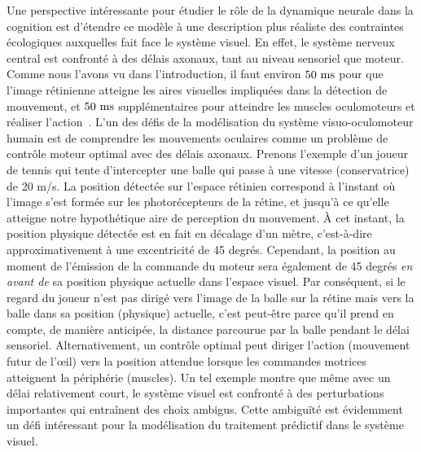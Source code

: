 Une perspective intéressante pour étudier le rôle de la dynamique
neurale dans la cognition est d'étendre ce modèle à une description plus
réaliste des contraintes écologiques auxquelles fait face le système
visuel. En effet, le système nerveux central est confronté à des délais
axonaux, tant au niveau sensoriel que moteur. Comme nous l'avons vu dans
l'introduction, il faut environ $50~\si{\milli\second}$ pour que l'image rétinienne
atteigne les aires visuelles impliquées dans la détection de mouvement,
et $50~\si{\milli\second}$ supplémentaires pour atteindre les muscles oculomoteurs et
réaliser l'action~\citep{Kirchner06}. L'un des défis de la
modélisation du système visuo-oculomoteur humain est de comprendre les
mouvements oculaires comme un problème de contrôle moteur optimal avec
des délais axonaux. Prenons l'exemple d'un joueur de tennis qui tente
d'intercepter une balle qui passe à une vitesse (conservatrice) de 20
m/s. La position détectée sur l'espace rétinien correspond à l'instant
où l'image s'est formée sur les photorécepteurs de la rétine, et jusqu'à
ce qu'elle atteigne notre hypothétique aire de perception du mouvement.
À cet instant, la position physique détectée est en fait en décalage d'un
mètre, c'est-à-dire approximativement à une excentricité de 45 degrés.
Cependant, la position au moment de l'émission de la commande du moteur
sera également de 45 degrés \emph{en avant de} sa position physique
actuelle dans l'espace visuel. Par conséquent, si le regard du joueur
n'est pas dirigé vers l'image de la balle sur la rétine mais vers la
balle dans sa position (physique) actuelle, c'est peut-être parce qu'il
prend en compte, de manière anticipée, la distance parcourue par la
balle pendant le délai sensoriel. Alternativement, un contrôle optimal
peut diriger l'action (mouvement futur de l'œil) vers la position
attendue lorsque les commandes motrices atteignent la périphérie
(muscles). Un tel exemple montre que même avec un délai relativement
court, le système visuel est confronté à des perturbations importantes
qui entraînent des choix ambigus. Cette ambiguïté est évidemment un défi
intéressant pour la modélisation du traitement prédictif dans le système
visuel.

